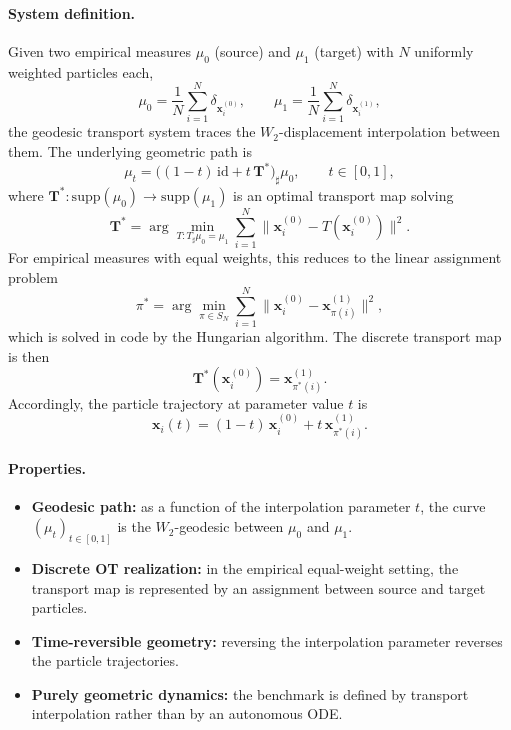 \documentclass[11pt]{article}
\newcommand{\1}{\mathbf{1}}
\begin{document}
\paragraph{System definition.}
Given two empirical measures \(\mu_0\) (source) and \(\mu_1\) (target) with \(N\) uniformly weighted particles each,
\[
\mu_0 = \frac{1}{N}\sum_{i=1}^N \delta_{\mathbf{x}_i^{(0)}}, 
\qquad 
\mu_1 = \frac{1}{N}\sum_{i=1}^N \delta_{\mathbf{x}_i^{(1)}},
\]
the geodesic transport system traces the \(W_2\)-displacement interpolation between them. The underlying geometric path is
\begin{equation}\label{eq:geodesic-interp}
\mu_t = \big((1-t)\,\mathrm{id} + t\,\mathbf{T}^*\big)_\sharp \mu_0, 
\qquad t \in [0,1],
\end{equation}
where \(\mathbf{T}^*: \mathrm{supp}(\mu_0)\to\mathrm{supp}(\mu_1)\) is an optimal transport map solving
\begin{equation}\label{eq:monge-problem}
\mathbf{T}^* = \arg\min_{T: T_\sharp \mu_0 = \mu_1} 
\sum_{i=1}^N \big\|\mathbf{x}_i^{(0)} - T(\mathbf{x}_i^{(0)})\big\|^2.
\end{equation}
For empirical measures with equal weights, this reduces to the linear assignment problem
\begin{equation}\label{eq:assignment}
\pi^* = \arg\min_{\pi \in S_N} \sum_{i=1}^N 
\big\|\mathbf{x}_i^{(0)} - \mathbf{x}_{\pi(i)}^{(1)}\big\|^2,
\end{equation}
which is solved in code by the Hungarian algorithm. The discrete transport map is then
\[
\mathbf{T}^*(\mathbf{x}_i^{(0)}) = \mathbf{x}_{\pi^*(i)}^{(1)}.
\]
Accordingly, the particle trajectory at parameter value \(t\) is
\[
\mathbf{x}_i(t) = (1-t)\,\mathbf{x}_i^{(0)} + t\,\mathbf{x}_{\pi^*(i)}^{(1)}.
\]

\paragraph{Properties.}
\begin{itemize}
\item \textbf{Geodesic path:} as a function of the interpolation parameter \(t\), the curve \((\mu_t)_{t\in[0,1]}\) is the \(W_2\)-geodesic between \(\mu_0\) and \(\mu_1\).
\item \textbf{Discrete OT realization:} in the empirical equal-weight setting, the transport map is represented by an assignment between source and target particles.
\item \textbf{Time-reversible geometry:} reversing the interpolation parameter reverses the particle trajectories.
\item \textbf{Purely geometric dynamics:} the benchmark is defined by transport interpolation rather than by an autonomous ODE.
\end{itemize}
\end{document}
